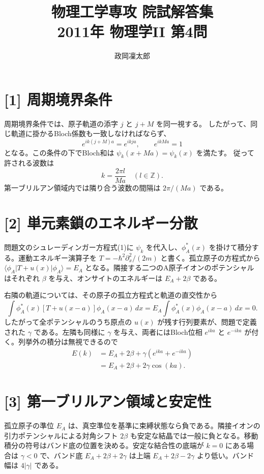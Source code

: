 \documentclass[11pt,a4paper]{article}
\title{物理工学専攻 院試解答集\\2011年 物理学II 第4問}
\author{政岡凜太郎}
\date{}
\begin{document}
\maketitle

\section*{[1] 周期境界条件}
周期境界条件では、原子軌道の添字 $j$ と $j+M$ を同一視する。
したがって、同じ軌道に掛かるBloch係数も一致しなければならず、
\begin{equation}
  e^{ik(j+M)a}=e^{ikja},\qquad e^{ikMa}=1
\end{equation}
となる。この条件の下でBloch和は $\psi_k(x+Ma)=\psi_k(x)$ を満たす。
従って許される波数は
\begin{equation}
  \boxed{k=\frac{2\pi l}{Ma}\quad(l\in\mathbb Z)}.
\end{equation}
第一ブリルアン領域内では隣り合う波数の間隔は $2\pi/(Ma)$ である。

\section*{[2] 単元素鎖のエネルギー分散}
問題文のシュレーディンガー方程式(1)に $\psi_k$ を代入し、$\phi_A^*(x)$ を掛けて積分する。運動エネルギー演算子を $T=-\hbar^2\partial_x^2/(2m)$ と書く。孤立原子の方程式から $\langle\phi_A|T+u(x)|\phi_A\rangle=E_A$ となる。隣接する二つのA原子イオンのポテンシャルはそれぞれ $\beta$ を与え、オンサイトのエネルギーは $E_A+2\beta$ である。

右隣の軌道については、その原子の孤立方程式と軌道の直交性から
\begin{equation}
 \int\phi_A^*(x)[T+u(x-a)]\phi_A(x-a)\,dx
 =E_A\int\phi_A^*(x)\phi_A(x-a)\,dx=0.
\end{equation}
したがって全ポテンシャルのうち原点の $u(x)$ が残す行列要素が、問題で定義された $\gamma$ である。左隣も同様に $\gamma$ を与え、両者にはBloch位相 $e^{ika}$ と $e^{-ika}$ が付く。列挙外の積分は無視できるので
\begin{align}
  E(k)&=E_A+2\beta+\gamma(e^{ika}+e^{-ika})\\
      &=\boxed{E_A+2\beta+2\gamma\cos(ka)}.
\end{align}

\section*{[3] 第一ブリルアン領域と安定性}
孤立原子の準位 $E_A$ は、真空準位を基準に束縛状態なら負である。隣接イオンの引力ポテンシャルによる対角シフト $2\beta$ も安定な結晶では一般に負となる。移動積分の符号はバンド底の位置を決める。安定な結合性の底端が $k=0$ にある場合は $\gamma<0$ で、バンド底 $E_A+2\beta+2\gamma$ は上端 $E_A+2\beta-2\gamma$ より低い。バンド幅は $4|\gamma|$ である。
\end{document}
